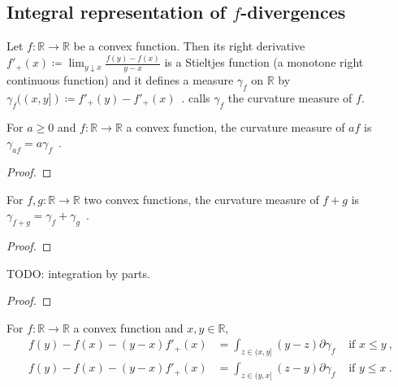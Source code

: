 \subsection{Integral representation of $f$-divergences}


\begin{definition}
  \label{def:curvatureMeasure}
  \leanok
  \uses{}
  Let $f: \mathbb{R} \to \mathbb{R}$ be a convex function. Then its right derivative $f'_+(x) \coloneqq \lim_{y \downarrow x}\frac{f(y) - f(x)}{y - x}$ is a Stieltjes function (a monotone right continuous function) and it defines a measure $\gamma_f$ on $\mathbb{R}$ by $\gamma_f((x,y]) \coloneqq f'_+(y) - f'_+(x)$~. \cite{liese2012phi} calls $\gamma_f$ the curvature measure of $f$.
\end{definition}


\begin{lemma}
  \label{lem:curvatureMeasure_mul}
  For $a \ge 0$ and $f: \mathbb{R} \to \mathbb{R}$ a convex function, the curvature measure of $af$ is $\gamma_{af} = a \gamma_f$~.
\end{lemma}

\begin{proof}%
\uses{}

\end{proof}


\begin{lemma}
  \label{lem:curvatureMeasure_add}
  For $f,g: \mathbb{R} \to \mathbb{R}$ two convex functions, the curvature measure of $f+g$ is $\gamma_{f+g} = \gamma_f + \gamma_g$~.
\end{lemma}

\begin{proof}%
\uses{}

\end{proof}


\begin{theorem}
  \label{thm:integration_by_parts}
  \notready
  \uses{}
  TODO: integration by parts.
\end{theorem}

\begin{proof} \notready
\uses{}

\end{proof}


\begin{lemma}
  \label{lem:convex_taylor}
  \leanok
  For $f: \mathbb{R} \to \mathbb{R}$ a convex function and $x,y \in \mathbb{R}$,
  \begin{align*}
  f(y) - f(x) - (y - x)f'_+(x) &= \int_{z \in (x,y]} (y - z) \partial \gamma_f & \text{ if } x \le y \: ,
  \\
  f(y) - f(x) - (y - x)f'_+(x) &= \int_{z \in (y,x]} (z - y) \partial \gamma_f & \text{ if } y \le x \: .
  \end{align*}
\end{lemma}

